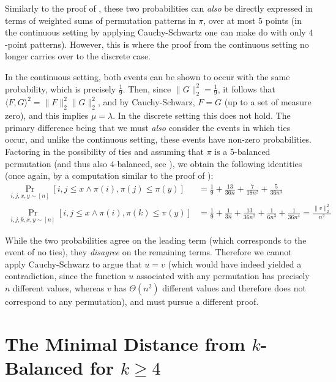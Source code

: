 \documentclass{article}
\theoremstyle{remark}
\theoremstyle{plain}
\begin{document}
Similarly to the proof of , these two probabilities can \emph{also} be directly expressed in terms of weighted sums of permutation patterns in $\pi$, over at most $5$ points (in the continuous setting by applying Cauchy-Schwartz one can make do with only $4$-point patterns). However, this is where the proof from the continuous setting no longer carries over to the discrete case.

In the continuous setting, both events can be shown to occur with the same probability, which is precisely $\frac{1}{9}$. Then, since $\| G \|_2^2 = \frac{1}{9}$, it follows that $\langle F,G \rangle^2 = \| F \|_2^2 \| G \|_2^2$, and by Cauchy-Schwarz, $F = G$ (up to a set of measure zero), and this implies $\mu = \lambda$. In the discrete setting this does not hold. The primary difference being that we must \emph{also} consider the events in which ties occur, and unlike the continuous setting, these events have non-zero probabilities. Factoring in the possibility of ties and assuming that $\pi$ is a $5$-balanced permutation (and thus also $4$-balanced, see ), we obtain the following identities (once again, by a computation similar to the proof of ):
\begin{align*}
\Pr_{i,j,x,y \sim [n]}[i,j \le x \land \pi(i),\pi(j) \le \pi(y) ] &= \frac{1}{9} + \frac{13}{36n} + \frac{7}{18n^2} + \frac{5}{36n^3} \\
\Pr_{i,j,k,x,y \sim [n]}[i,j \le x \land \pi(i),\pi(k) \le \pi(y) ] &= \frac{1}{9} + \frac{1}{3n} + \frac{13}{36n^2} + \frac{1}{6n^3} + \frac{1}{36n^4} = \frac{\| v \|_2^2}{n^2}    
\end{align*}

While the two probabilities agree on the leading term (which corresponds to the event of no ties), they \emph{disagree} on the remaining terms. Therefore we cannot apply Cauchy-Schwarz to argue that $u=v$ (which would have indeed yielded a contradiction, since the function $u$ associated with any permutation has precisely $n$ different values, whereas $v$ has $\Theta(n^2)$ different values and therefore does not correspond to any permutation), and must pursue a different proof. 
 \section{The Minimal Distance from \texorpdfstring{$k$}{k}-Balanced for \texorpdfstring{$k \ge 4$}{k >= 4}}
\label{section:min_dist_kbal}
\end{document}
